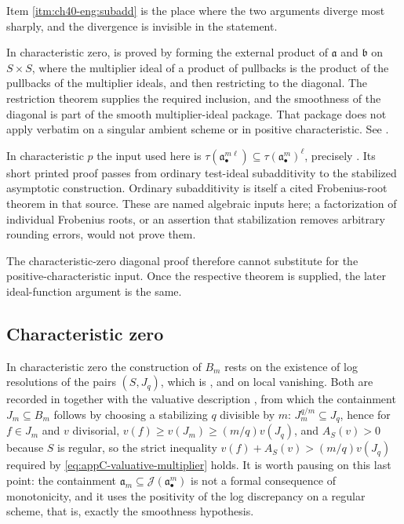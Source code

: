\begin{remark}
\label{rem:ch40-subadditivity-two-proofs}
Item \cref{itm:ch40-eng:subadd} is the place where the two arguments diverge
most sharply, and the divergence is invisible in the statement.

In characteristic zero,  is proved by
forming the external product of $\mathfrak a$ and $\mathfrak b$ on
$S\times S$, where the multiplier ideal of a product of pullbacks is the
product of the pullbacks of the multiplier ideals, and then restricting to
the diagonal.  The restriction theorem supplies the required inclusion,
and the smoothness of the diagonal is part of the smooth multiplier-ideal
package.  That package does not apply verbatim on a singular ambient
scheme or in positive characteristic.  See \cite{DEL00}.

In characteristic $p$ the input used here is
$\tau(\mathfrak a_\bullet^{m\ell})\subseteq
\tau(\mathfrak a_\bullet^m)^\ell$, precisely
\cite[Proposition~3.1(ii)]{MustataTest}.  Its short printed proof passes
from ordinary test-ideal subadditivity to the stabilized asymptotic
construction.  Ordinary subadditivity is itself a cited Frobenius-root
theorem in that source.  These are named algebraic inputs here; a
factorization of individual Frobenius roots, or an assertion that
stabilization removes arbitrary rounding errors, would not prove them.

The characteristic-zero diagonal proof therefore cannot substitute for
the positive-characteristic input.  Once the respective theorem is
supplied, the later ideal-function argument is the same.
\end{remark}

\subsection{Characteristic zero}
\label{sec:ch40-char-zero}

In characteristic zero the construction of $B_m$ rests on the existence of
log resolutions of the pairs $(S,J_q)$, which is
, and on local vanishing.  Both are recorded in
 together with the valuative description
, from which the containment
$J_m\subseteq B_m$ follows by choosing a stabilizing $q$ divisible by $m$:
$J_m^{q/m}\subseteq J_q$, hence for $f\in J_m$ and $v$ divisorial,
$v(f)\ge v(J_m)\ge(m/q)v(J_q)$, and
$A_S(v)>0$ because $S$ is regular, so the strict inequality
$v(f)+A_S(v)>(m/q)v(J_q)$ required by
\eqref{eq:appC-valuative-multiplier} holds.  It is worth pausing on this
last point: the containment $\mathfrak a_m\subseteq\mathcal J(\mathfrak
a_\bullet^m)$ is not a formal consequence of monotonicity, and it uses the
positivity of the log discrepancy on a regular scheme, that is, exactly the
smoothness hypothesis.

